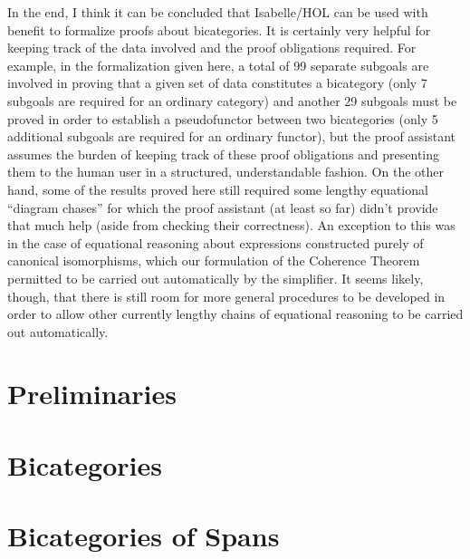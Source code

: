 \documentclass[11pt,notitlepage,a4paper]{report}
\begin{document}
In the end, I think it can be concluded that Isabelle/HOL can be used with benefit to formalize
proofs about bicategories.  It is certainly very helpful for keeping track of the data
involved and the proof obligations required.  For example, in the formalization given here,
a total of 99 separate subgoals are involved in proving that a given set of data constitutes
a bicategory (only 7 subgoals are required for an ordinary category)
and another 29 subgoals must be proved in order to establish a pseudofunctor between two
bicategories (only 5 additional subgoals are required for an ordinary functor),
but the proof assistant assumes the burden of keeping track of these proof obligations and
presenting them to the human user in a structured, understandable fashion.
On the other hand, some of the results proved here still required some lengthy equational
``diagram chases'' for which the proof assistant (at least so far) didn't provide that much help
(aside from checking their correctness).
An exception to this was in the case of equational reasoning about expressions constructed
purely of canonical isomorphisms, which our formulation of the Coherence Theorem permitted
to be carried out automatically by the simplifier.
It seems likely, though, that there is still room for more general procedures to be developed
in order to allow other currently lengthy chains of equational reasoning to be carried out
automatically.

{}
\chapter*{Preliminaries}



\chapter{Bicategories}











\chapter{Bicategories of Spans}






{}



\end{document}
